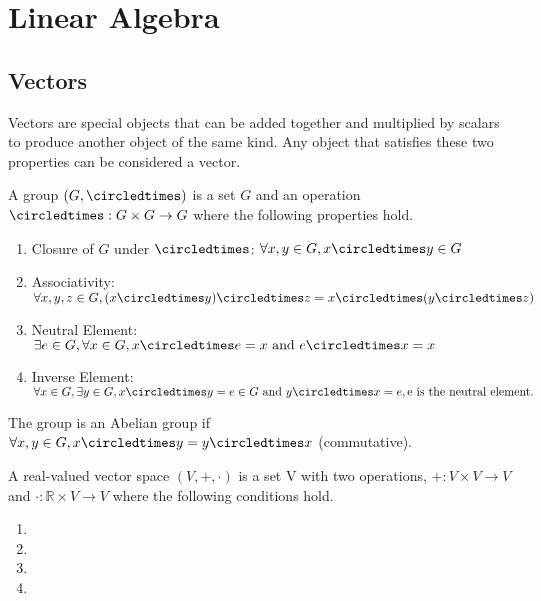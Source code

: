 \chapter{Linear Algebra}

\section{Vectors}
\begin{definition}[Vectors]
    Vectors are special objects that can be added together and multiplied
    by scalars to produce another object of the same kind. Any object that
    satisfies these two properties can be considered a vector.
\end{definition}

\begin{definition}[Groups]
    A group $(G, \circledtimes)$ is a set $G$ and an operation $\circledtimes : G\times G \rightarrow G$
    where the following properties hold.
    \begin{enumerate}
        \item{Closure of $G$ under $\circledtimes$:
            $\forall x, y\in G, x\circledtimes y\in G$}
        \item{Associativity:
            $\forall x, y,z\in G, (x\circledtimes y)\circledtimes z = x\circledtimes(y\circledtimes z)$}
        \item{Neutral Element: 
            $\exists e\in G, \forall x\in G, x\circledtimes e = x\text{ and } e\circledtimes x = x$}
        \item{Inverse Element:
            $\forall x\in G,\exists y\in G, x\circledtimes y = e\in G \text{ and } y \circledtimes x = e, \text{e is the neutral element.}$}
    \end{enumerate}
    The group is an Abelian group if $\forall x, y\in G, x\circledtimes y = y\circledtimes x$
    (commutative).
\end{definition}

\begin{definition}
    A real-valued vector space $(V, +, \cdot)$ is a set V with two operations,
    $+: V \times V \rightarrow V$ and $\cdot : \mathbb{R} \times V \rightarrow V$ where
    the following conditions hold.
    \begin{enumerate}
        \item{}
        \item{}
        \item{}
        \item{}
    \end{enumerate}
\end{definition}

